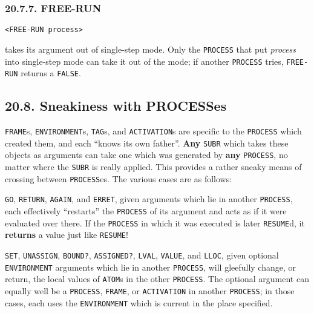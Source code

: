 \documentclass[a4paper,]{article}
\begin{document}
\subsubsection{20.7.7. FREE-RUN}\label{free-run}

\begin{verbatim}
<FREE-RUN process>
\end{verbatim}

 takes its argument out of single-step mode. Only the \texttt{PROCESS} that put
\emph{process} into single-step mode can take it out of the mode; if another \texttt{PROCESS} tries, \texttt{FREE-RUN}
returns a \texttt{FALSE}.

\subsection{20.8. Sneakiness with PROCESSes}\label{sneakiness-with-processes}

\texttt{FRAME}s, \texttt{ENVIRONMENT}s, \texttt{TAG}s, and \texttt{ACTIVATION}s are specific to the
\texttt{PROCESS} which created them, and each ``knows its own father''. \textbf{Any} \texttt{SUBR} which takes these
objects as arguments can take one which was generated by \textbf{any} \texttt{PROCESS}, no matter where the \texttt{SUBR}
is really applied. This provides a rather sneaky means of crossing between \texttt{PROCESS}es. The various cases are as
follows:

\texttt{GO}, \texttt{RETURN}, \texttt{AGAIN}, and
\texttt{ERRET}, given arguments which lie in another \texttt{PROCESS}, each effectively ``restarts''
the \texttt{PROCESS} of its argument and acts as if it were evaluated over there. If the \texttt{PROCESS} in which it was
executed is later \texttt{RESUME}d, it \textbf{returns} a value just like \texttt{RESUME}!

\texttt{SET}, \texttt{UNASSIGN}, \texttt{BOUND?},
\texttt{ASSIGNED?}, \texttt{LVAL}, \texttt{VALUE}, and
\texttt{LLOC}, given optional \texttt{ENVIRONMENT} arguments which lie in another \texttt{PROCESS},
will gleefully change, or return, the local values of \texttt{ATOM}s in the other \texttt{PROCESS}. The optional argument
can equally well be a \texttt{PROCESS}, \texttt{FRAME}, or \texttt{ACTIVATION} in another \texttt{PROCESS}; in those cases,
each uses the \texttt{ENVIRONMENT} which is current in the place specified.
\end{document}
